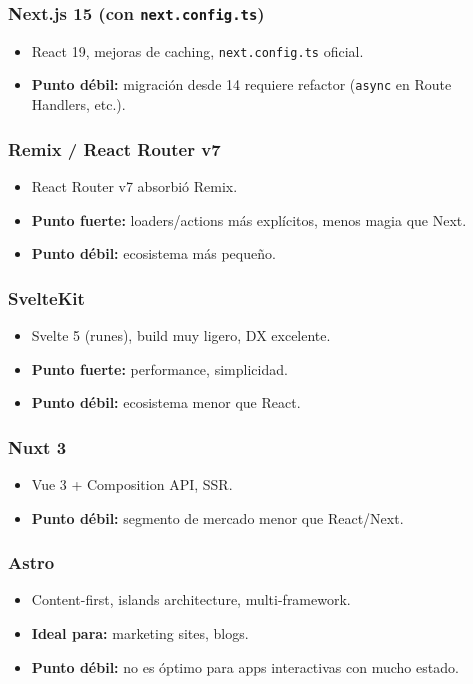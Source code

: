 \documentclass[11pt,a4paper]{article}
\begin{document}
\subsubsection{Next.js 15 (con \texttt{next.config.ts})}
\begin{itemize}[leftmargin=*,itemsep=0pt]
\item React 19, mejoras de caching, \texttt{next.config.ts} oficial.
\item \textbf{Punto débil:} migración desde 14 requiere refactor (\texttt{async} en Route Handlers, etc.).
\end{itemize}

\subsubsection{Remix / React Router v7}
\begin{itemize}[leftmargin=*,itemsep=0pt]
\item React Router v7 absorbió Remix.
\item \textbf{Punto fuerte:} loaders/actions más explícitos, menos magia que Next.
\item \textbf{Punto débil:} ecosistema más pequeño.
\end{itemize}

\subsubsection{SvelteKit}
\begin{itemize}[leftmargin=*,itemsep=0pt]
\item Svelte 5 (runes), build muy ligero, DX excelente.
\item \textbf{Punto fuerte:} performance, simplicidad.
\item \textbf{Punto débil:} ecosistema menor que React.
\end{itemize}

\subsubsection{Nuxt 3}
\begin{itemize}[leftmargin=*,itemsep=0pt]
\item Vue 3 + Composition API, SSR.
\item \textbf{Punto débil:} segmento de mercado menor que React/Next.
\end{itemize}

\subsubsection{Astro}
\begin{itemize}[leftmargin=*,itemsep=0pt]
\item Content-first, islands architecture, multi-framework.
\item \textbf{Ideal para:} marketing sites, blogs.
\item \textbf{Punto débil:} no es óptimo para apps interactivas con mucho estado.
\end{itemize}
\end{document}

